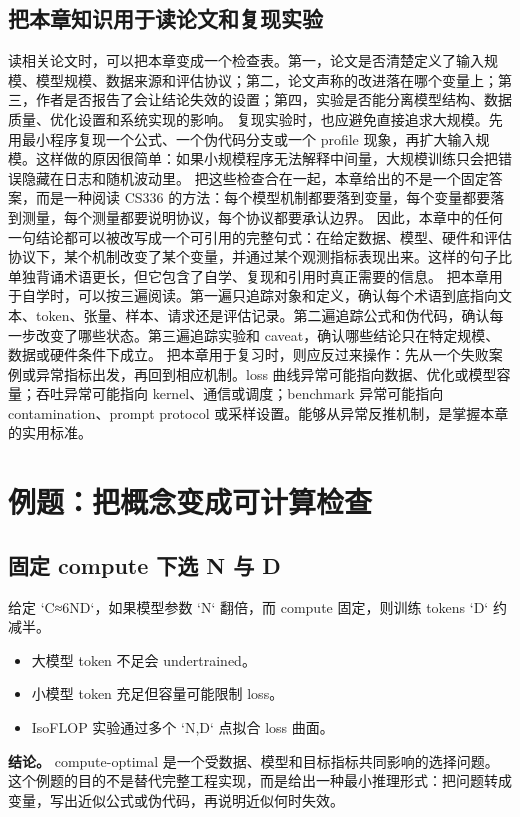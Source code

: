 \documentclass[a4paper]{article}
\begin{document}
\subsection{把本章知识用于读论文和复现实验}
读相关论文时，可以把本章变成一个检查表。第一，论文是否清楚定义了输入规模、模型规模、数据来源和评估协议；第二，论文声称的改进落在哪个变量上；第三，作者是否报告了会让结论失效的设置；第四，实验是否能分离模型结构、数据质量、优化设置和系统实现的影响。
复现实验时，也应避免直接追求大规模。先用最小程序复现一个公式、一个伪代码分支或一个 profile 现象，再扩大输入规模。这样做的原因很简单：如果小规模程序无法解释中间量，大规模训练只会把错误隐藏在日志和随机波动里。
把这些检查合在一起，本章给出的不是一个固定答案，而是一种阅读 CS336 的方法：每个模型机制都要落到变量，每个变量都要落到测量，每个测量都要说明协议，每个协议都要承认边界。
因此，本章中的任何一句结论都可以被改写成一个可引用的完整句式：在给定数据、模型、硬件和评估协议下，某个机制改变了某个变量，并通过某个观测指标表现出来。这样的句子比单独背诵术语更长，但它包含了自学、复现和引用时真正需要的信息。
把本章用于自学时，可以按三遍阅读。第一遍只追踪对象和定义，确认每个术语到底指向文本、token、张量、样本、请求还是评估记录。第二遍追踪公式和伪代码，确认每一步改变了哪些状态。第三遍追踪实验和 caveat，确认哪些结论只在特定规模、数据或硬件条件下成立。
把本章用于复习时，则应反过来操作：先从一个失败案例或异常指标出发，再回到相应机制。loss 曲线异常可能指向数据、优化或模型容量；吞吐异常可能指向 kernel、通信或调度；benchmark 异常可能指向 contamination、prompt protocol 或采样设置。能够从异常反推机制，是掌握本章的实用标准。
\section{例题：把概念变成可计算检查}
\subsection{固定 compute 下选 N 与 D}
给定 `C≈6ND`，如果模型参数 `N` 翻倍，而 compute 固定，则训练 tokens `D` 约减半。
\begin{itemize}
\item 大模型 token 不足会 undertrained。
\item 小模型 token 充足但容量可能限制 loss。
\item IsoFLOP 实验通过多个 `N,D` 点拟合 loss 曲面。
\end{itemize}
\textbf{结论。} compute-optimal 是一个受数据、模型和目标指标共同影响的选择问题。
这个例题的目的不是替代完整工程实现，而是给出一种最小推理形式：把问题转成变量，写出近似公式或伪代码，再说明近似何时失效。
\end{document}
